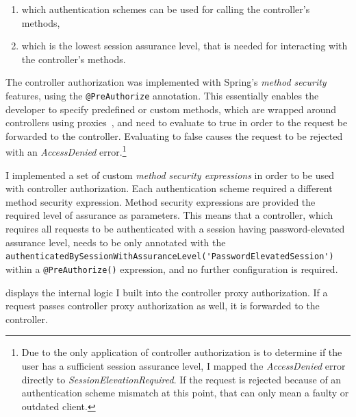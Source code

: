 \begin{enumerate}
\item which authentication schemes can be used for calling the controller's methods,
\item which is the lowest session assurance level, that is needed for interacting with the controller's methods.
\end{enumerate}

The controller authorization was implemented with Spring's \emph{method security} features, using the \lstinline{@PreAuthorize} annotation. This essentially enables the developer to specify predefined or custom methods, which are wrapped around controllers using proxies~\cite{spring-boot-reference-docs}, and need to evaluate to true in order to the request be forwarded to the controller. Evaluating to false causes the request to be rejected with an \emph{AccessDenied} error.\footnote{Due to the only application of controller authorization is to determine if the user has a sufficient session assurance level, I mapped the \emph{AccessDenied} error directly to \emph{SessionElevationRequired}. If the request is rejected because of an authentication scheme mismatch at this point, that can only mean a faulty or outdated client.}

I implemented a set of custom \emph{method security expressions} in order to be used with controller authorization. Each authentication scheme required a different method security expression. Method security expressions are provided the required level of assurance as parameters. This means that a controller, which requires all requests to be authenticated with a session having password-elevated assurance level, needs to be only annotated with the \lstinline{authenticatedBySessionWithAssuranceLevel('PasswordElevatedSession')} within a \lstinline{@PreAuthorize()} expression, and no further configuration is required.

 displays the internal logic I built into the controller proxy authorization. If a request passes controller proxy authorization as well, it is forwarded to the controller.

